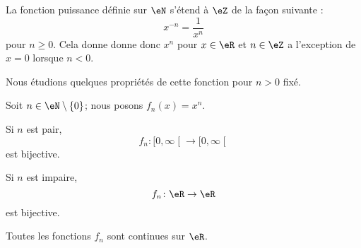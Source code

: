 \begin{definition}
    La fonction puissance définie sur \( \eN\) s'étend à \( \eZ\) de la façon suivante :
    \begin{equation}
        x^{-n}=\frac{1}{ x^n }
    \end{equation}
    pour \( n\geq 0\). Cela donne donne donc \( x^n\) pour \( x\in \eR\) et \( n\in \eZ\) a l'exception de \( x=0\) lorsque \( n<0\).
\end{definition}

Nous étudions quelques propriétés de cette fonction pour \( n>0\) fixé.

\begin{proposition}     \label{PROPooXQYFooPxoEHE}
    Soit \( n\in \eN\setminus\{ 0 \}\); nous posons \( f_n(x)=x^n\).

    Si \( n\) est pair,
    \begin{equation}
        f_n\colon \mathopen[ 0 , \infty \mathclose[\to \mathopen[ 0 , \infty \mathclose[
    \end{equation}
    est bijective.

    Si \( n\) est impaire,
    \begin{equation}
        f_n\colon \eR \to \eR
    \end{equation}
    est bijective.

    Toutes les fonctions \( f_n\) sont continues sur \( \eR\).
\end{proposition}

